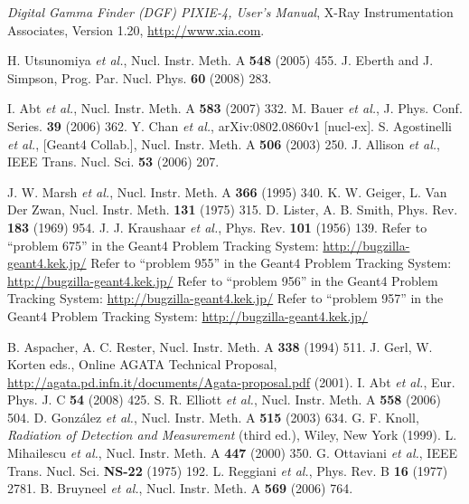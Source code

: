 \begin{thebibliography}{99}
\textit{Digital Gamma Finder (DGF) PIXIE-4, User's Manual}, X-Ray Instrumentation Associates, Version 1.20, \url{http://www.xia.com}.%

H. Utsunomiya \textit{et al.}, Nucl. Instr. Meth. A \textbf{548} (2005) 455.
J. Eberth and J. Simpson, Prog. Par. Nucl. Phys. \textbf{60} (2008) 283.

I. Abt \textit{et al.}, Nucl. Instr. Meth. A \textbf{583} (2007) 332.
M. Bauer \textit{et al.}, J. Phys. Conf. Series. \textbf{39} (2006) 362.
Y. Chan \textit{et al.}, arXiv:0802.0860v1 [nucl-ex].
S. Agostinelli \textit{et al.}, [Geant4 Collab.], Nucl. Instr. Meth. A \textbf{506} (2003) 250.
J. Allison \textit{et al.}, IEEE Trans. Nucl. Sci. \textbf{53} (2006) 207.

J. W. Marsh \textit{et al.}, Nucl. Instr. Meth. A \textbf{366} (1995) 340.
K. W. Geiger, L. Van Der Zwan, Nucl. Instr. Meth. \textbf{131} (1975) 315.
D. Lister, A. B. Smith, Phys. Rev. \textbf{183} (1969)   954.
J. J. Kraushaar \textit{et al.}, Phys. Rev. \textbf{101} (1956) 139.
Refer to ``problem 675'' in the Geant4 Problem Tracking System: \url{http://bugzilla-geant4.kek.jp/}
Refer to ``problem 955'' in the Geant4 Problem Tracking System: \url{http://bugzilla-geant4.kek.jp/}
Refer to ``problem 956'' in the Geant4 Problem Tracking System: \url{http://bugzilla-geant4.kek.jp/}
Refer to ``problem 957'' in the Geant4 Problem Tracking System: \url{http://bugzilla-geant4.kek.jp/}

B. Aspacher, A. C. Rester, Nucl. Instr. Meth. A \textbf{338} (1994) 511.
J. Gerl, W. Korten eds., Online AGATA Technical Proposal, \url{http://agata.pd.infn.it/documents/Agata-proposal.pdf} (2001).
I. Abt \textit{et al.}, Eur. Phys. J. C \textbf{54} (2008) 425.
S. R. Elliott \textit{et al.}, Nucl. Instr. Meth. A \textbf{558} (2006) 504.
D. Gonz\'alez \textit{et al.}, Nucl. Instr. Meth. A \textbf{515} (2003) 634.
G. F. Knoll, \textit{Radiation of Detection and Measurement} (third ed.), Wiley, New York (1999).
L. Mihailescu \textit{et al.}, Nucl. Instr. Meth. A \textbf{447} (2000) 350.
G. Ottaviani \textit{et al.}, IEEE Trans. Nucl. Sci. \textbf{NS-22} (1975) 192.
L. Reggiani \textit{et al.}, Phys. Rev. B \textbf{16} (1977) 2781.
B. Bruyneel \textit{et al.}, Nucl. Instr. Meth. A \textbf{569} (2006) 764.%

\end{thebibliography}


